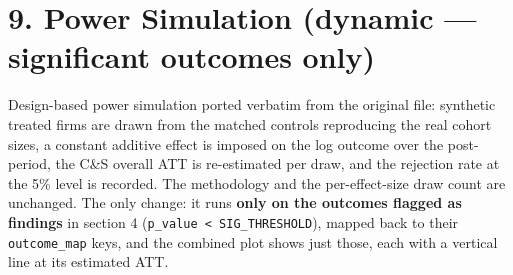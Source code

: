 \documentclass[
]{article}
\begin{document}
\section{9. Power Simulation (dynamic --- significant outcomes
only)}\label{power-simulation-dynamic-significant-outcomes-only}

Design-based power simulation ported verbatim from the original file:
synthetic treated firms are drawn from the matched controls reproducing
the real cohort sizes, a constant additive effect is imposed on the log
outcome over the post-period, the C\&S overall ATT is re-estimated per
draw, and the rejection rate at the 5\% level is recorded. The
methodology and the per-effect-size draw count are unchanged. The only
change: it runs \textbf{only on the outcomes flagged as findings} in
section 4 (\texttt{p\_value\ \textless{}\ SIG\_THRESHOLD}), mapped back
to their \texttt{outcome\_map} keys, and the combined plot shows just
those, each with a vertical line at its estimated ATT.
\end{document}

